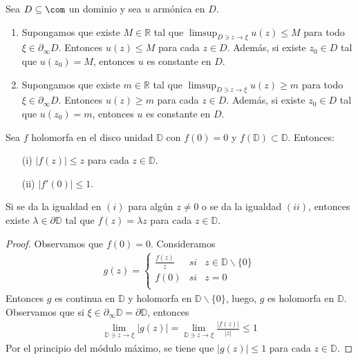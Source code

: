 \begin{teo}
Sea $D \subseteq \com$ un dominio y sea $u$ armónica en $D$.
\begin{enumerate}
    \item Supongamos que existe $M \in \mathbb{R}$ tal que $\limsup_{D \ni z \to \xi} u(z) \leq M$ para todo $\xi \in \partial_{\infty} D$. Entonces $u(z) \leq M$ para cada $z \in D$. Además, si existe $z_0 \in D$ tal que $u(z_0) = M$, entonces $u$ es constante en $D$.
    \item Supongamos que existe $m \in \mathbb{R}$ tal que $\limsup_{D \ni z \to \xi} u(z) \ge m$ para todo $\xi \in \partial_{\infty} D$. Entonces $u(z) \ge m$ para cada $z \in D$. Además, si existe $z_0 \in D$ tal que $u(z_0) = m$, entonces $u$ es constante en $D$.
\end{enumerate}
\end{teo}

\begin{teo}
Sea $f$ holomorfa en el disco unidad $\mathbb{D}$ con $f(0) = 0$ y $f(\mathbb{D}) \subset \mathbb{D}$. Entonces:
\begin{enumerate}
    \item[(i)] $|f(z)| \leq z$ para cada $z \in \mathbb{D}$.
    \item[(ii)] $|f'(0)| \leq 1$.
\end{enumerate}
Si se da la igualdad en $(i)$ para algún $z \not = 0$ o se da la igualdad $(ii)$, entonces existe $\lambda \in \partial \mathbb{D}$ tal que $f(z) = \lambda z$ para cada $z \in \mathbb{D}$.
\end{teo}

\begin{proof}
Observamos que $f(0) = 0$. Consideramos
\begin{align*}
    g(z) = \left\{ \begin{array}{lcc}
             \frac{f(z)}{z} &  si  & z \in \mathbb{D} \backslash \{0\}\\
             f(0) &  si & z = 0 \\
             \end{array}
   \right.
\end{align*}
Entonces $g$ es continua en $\mathbb{D}$ y holomorfa en $\mathbb{D} \backslash\{0\}$, luego, $g$ es holomorfa en $\mathbb{D}$. Observamos que si $\xi \in \partial_{\infty} \mathbb{D} = \partial \mathbb{D}$, entonces
\begin{align*}
    \lim_{\mathbb{D} \ni z \to \xi} |g(z)| = \lim_{\mathbb{D} \ni z \to \xi} \frac{|f(z)|}{|z|} \leq 1
\end{align*}
Por el principio del módulo máximo, se tiene que $|g(z)| \leq 1$ para cada $z \in \mathbb{D}$.
\end{proof}

